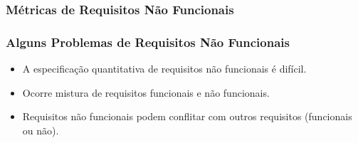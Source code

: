 \documentclass[a4paper, 11pt]{article}
\begin{document}
\subsubsection{Métricas de Requisitos Não Funcionais}


\subsubsection{Alguns Problemas de Requisitos Não Funcionais}
\begin{itemize}
	\item A especificação quantitativa de requisitos não funcionais é difícil.
	\item Ocorre mistura de requisitos funcionais e não funcionais.
	\item Requisitos não funcionais podem conflitar com outros requisitos (funcionais ou não).
\end{itemize}

\end{document}
